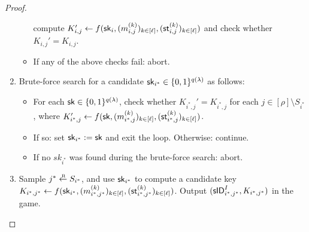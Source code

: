 \begin{proof}
\begin{enumerate}[itemsep=0.1cm]
\begin{itemize}[label={\textbullet},itemsep=0.1cm]
                  compute \(K_{i,j}' \leftarrow f(\mathsf{sk}_{i},(m_{i,j}^{(k)})_{k \in [\ell]},(\mathsf{st}_{i,j}^{(k)})_{k \in [\ell]})\)
                  and check whether \(K_{i,j}' = K_{i,j}\).
            \item If any of the above checks fail: abort.
          \end{itemize}
     \item\label{owfsst:advA:brute} Brute-force search for a candidate \(\mathsf{sk}_{i^{*}} \in \{0,1\}^{q(\lambda)}\) as follows:
          \begin{itemize}[label={\textbullet},itemsep=0.1cm]
            \item For each \(\mathsf{sk} \in \{0,1\}^{q(\lambda)}\),
                  check whether \(K_{i^{*},j}' = K_{i^{*},j}\) for each \(j \in [\rho] \setminus S_{i^{*}}\),
                  where \(K_{i^{*},j}' \leftarrow f(\mathsf{sk},(m_{i^{*},j}^{(k)})_{k \in [\ell]},(\mathsf{st}_{i^{*},j}^{(k)})_{k \in [\ell]})\).
            \item If so: set \(\mathsf{sk}_{i^{*}} := \mathsf{sk}\) and exit the loop. Otherwise: continue.
            \item If no \(sk_{i^{*}}\) was found during the brute-force search: abort.
          \end{itemize}
    \item Sample \(j^{*} \sampleR S_{i^{*}}\),
          and use \(\mathsf{sk}_{i^{*}}\) to compute a candidate key
          \(K_{i^{*}, j^{*}} \leftarrow f(\mathsf{sk}_{i^{*}},(m_{i^{*},j^{*}}^{(k)})_{k \in [\ell]},(\mathsf{st}_{i^{*},j^{*}}^{(k)})_{k \in [\ell]})\).
          Output \((\mathsf{sID}_{i^{*},j^{*}}^{I}, K_{i^{*}, j^{*}})\) in the \OwFSst game.
  \end{enumerate}


\end{proof}
